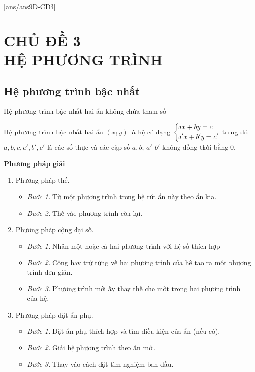 

[ans/ans9D-CD3]

\chapter*{CHỦ ĐỀ 3 \\ HỆ PHƯƠNG TRÌNH}
\setcounter{section}{0}

\section{Hệ phương trình bậc nhất}
\setcounter{ex}{0}
\begin{dang}{Hệ phương trình bậc nhất hai ẩn  không  chứa tham số}
\begin{dn}
Hệ phương trình bậc nhất hai ẩn $(x;y)$ là hệ có dạng $\left\{\begin{aligned}& ax+by=c\\ & a'x +b'y=c'\end{aligned}\right.$ trong đó $a,b,c,a',b',c'$ là các số thực và các cặp số $a,b$; $a',b'$ không đồng thời bằng 0.
\end{dn}

 {\bf Phương pháp giải}
\begin{enumerate}[1)]
\item Phương pháp thế.
	\begin{itemize}
	\item {\it Bước 1.} Từ một phương trình trong hệ rút ẩn này theo ẩn kia.
	\item {\it Bước 2.} Thế vào phương trình còn lại.
	\end{itemize}
\item Phương pháp cộng đại số.
	\begin{itemize}
	\item {\it Bước 1.} Nhân một hoặc cả hai phương trình với hệ số thích hợp
	\item {\it Bước 2.} Cộng hay trừ từng vế hai phương trình của hệ tạo ra một phương trình đơn giản.
	\item {\it Bước 3.} Phương trình  mới ấy thay thế cho một trong hai phương trình của hệ.
	\end{itemize}
\item Phương pháp đặt ẩn phụ.
	\begin{itemize}
	\item {\it Bước 1.} Đặt ẩn phụ thích hợp và tìm điều kiện của ẩn (nếu có).
	\item {\it Bước 2.} Giải hệ phương trình theo ẩn mới.
	\item {\it Bước 3.} Thay vào cách đặt tìm nghiệm ban đầu.
	\end{itemize}
\end{enumerate}
\end{dang}

